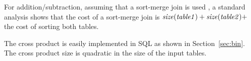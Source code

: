 \documentclass{sig-alternate-2013}
\newcommand{\ct}{\mathit{ct}}
\begin{document}
For addition/subtraction, assuming that a sort-merge join is used \cite{Ullman1982}, a standard analysis shows that the cost of a sort-merge join is $\it{size}(table1) + \it{size}(table2) +$ the cost of sorting both tables. 

The cross product is easily implemented in SQL as shown in Section~\ref{sec:bin}. The cross product size is quadratic in the size of the input tables.
\end{document}
